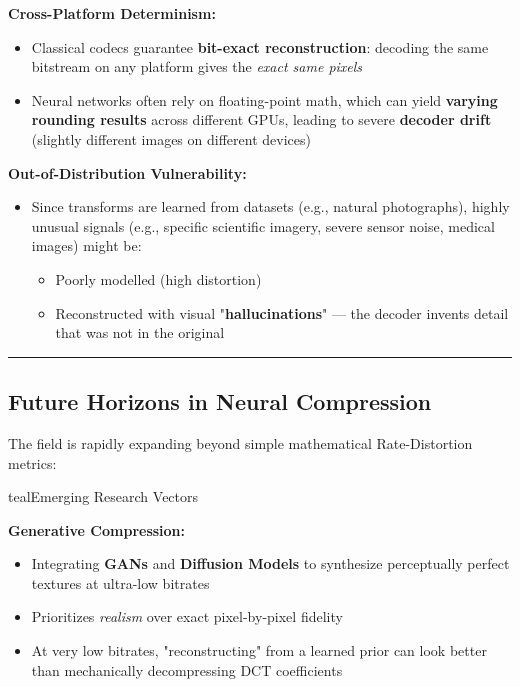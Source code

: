 \textbf{Cross-Platform Determinism:}
\begin{itemize}
\item Classical codecs guarantee \textbf{bit-exact reconstruction}: decoding the same bitstream on any platform gives the \textit{exact same pixels}
\item Neural networks often rely on floating-point math, which can yield \textbf{varying rounding results} across different GPUs, leading to severe \textbf{decoder drift} (slightly different images on different devices)
\end{itemize}

\textbf{Out-of-Distribution Vulnerability:}
\begin{itemize}
\item Since transforms are learned from datasets (e.g., natural photographs), highly unusual signals (e.g., specific scientific imagery, severe sensor noise, medical images) might be:
\begin{itemize}
\item Poorly modelled (high distortion)
\item Reconstructed with visual "\textbf{hallucinations}" — the decoder invents detail that was not in the original
\end{itemize}
\end{itemize}

\bigskip\hrule\bigskip

\subsection{Future Horizons in Neural Compression}

The field is rapidly expanding beyond simple mathematical Rate-Distortion metrics:

\begin{calloutbox}{teal}{Emerging Research Vectors}

\end{calloutbox}

\textbf{Generative Compression:}
\begin{itemize}
\item Integrating \textbf{GANs} and \textbf{Diffusion Models} to synthesize perceptually perfect textures at ultra-low bitrates
\item Prioritizes \textit{realism} over exact pixel-by-pixel fidelity
\item At very low bitrates, "reconstructing" from a learned prior can look better than mechanically decompressing DCT coefficients
\end{itemize}


